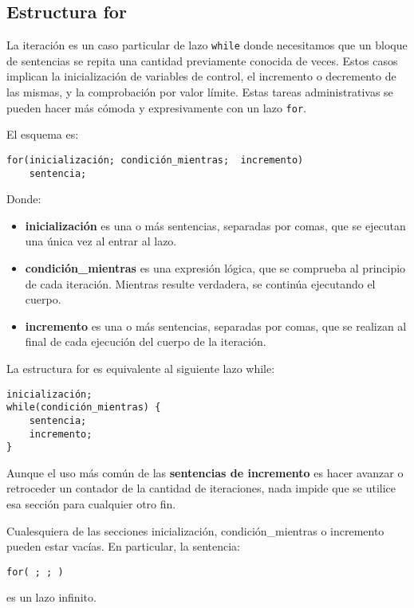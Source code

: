 \subsection{Estructura for}

La iteración es un caso particular de lazo \lstinline{while} donde necesitamos que un
bloque de sentencias se repita una cantidad previamente conocida de veces.
Estos casos implican la inicialización de variables de control, el incremento o
decremento de las mismas, y la comprobación por valor límite.
Estas tareas administrativas se pueden hacer más cómoda y expresivamente con un
lazo \lstinline{for}. 

El esquema es:
\begin{lstlisting}
for(inicialización; condición_mientras;  incremento)
    sentencia;
\end{lstlisting}

Donde:
\begin{itemize}
	\item \textbf{inicialización} es una o más sentencias, separadas por comas, que se
      ejecutan una única vez al entrar al lazo.
	\item \textbf{condición\_mientras} es una expresión lógica, que se comprueba al principio
      de cada iteración. Mientras resulte verdadera, se continúa ejecutando el
      cuerpo.
	\item \textbf{incremento} es una o más sentencias, separadas por comas, que se realizan
      al final de cada ejecución del cuerpo de la iteración. 
\end{itemize}
    
La estructura for es equivalente al siguiente lazo while:
\begin{lstlisting}
inicialización;
while(condición_mientras) {
    sentencia;
    incremento;
}
\end{lstlisting}

Aunque el uso más común de las \textbf{sentencias de incremento} es hacer avanzar o retroceder
un contador de la cantidad de iteraciones, nada impide que se utilice esa
sección para cualquier otro fin. 

Cualesquiera de las secciones inicialización, condición\_mientras o incremento
pueden estar vacías. En particular, la sentencia:
\begin{lstlisting}
for( ; ; )
\end{lstlisting}
es un lazo infinito.

